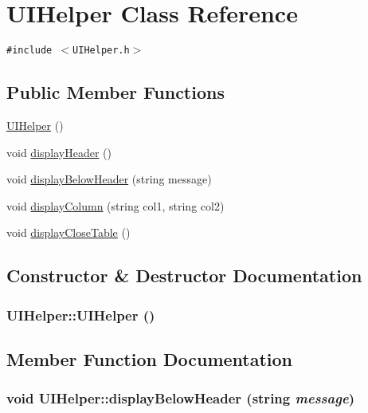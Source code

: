 \hypertarget{class_u_i_helper}{
\section{UIHelper Class Reference}
\label{class_u_i_helper}
}
{\tt \#include $<$UIHelper.h$>$}

\subsection*{Public Member Functions}
\begin{CompactItemize}
\item 
\hyperlink{class_u_i_helper_064f3bdbb8bc6545e365a04e701b2cb3}{UIHelper} ()
\item 
void \hyperlink{class_u_i_helper_626a53a3308909e66c67873826055ff9}{display\-Header} ()
\item 
void \hyperlink{class_u_i_helper_719a5786c348b5f4eff8811758726d1c}{display\-Below\-Header} (string message)
\item 
void \hyperlink{class_u_i_helper_4da5ae4ff9d2936bcb7463a79b4695be}{display\-Column} (string col1, string col2)
\item 
void \hyperlink{class_u_i_helper_dac3e7eda05dfd140c77278ab46fcd6d}{display\-Close\-Table} ()
\end{CompactItemize}


\subsection{Constructor \& Destructor Documentation}
\hypertarget{class_u_i_helper_064f3bdbb8bc6545e365a04e701b2cb3}{
\subsubsection[UIHelper]{\setlength{\rightskip}{0pt plus 5cm}UIHelper::UIHelper ()}}
\label{class_u_i_helper_064f3bdbb8bc6545e365a04e701b2cb3}




\subsection{Member Function Documentation}
\hypertarget{class_u_i_helper_719a5786c348b5f4eff8811758726d1c}{
\subsubsection[displayBelowHeader]{\setlength{\rightskip}{0pt plus 5cm}void UIHelper::display\-Below\-Header (string {\em message})}}
\label{class_u_i_helper_719a5786c348b5f4eff8811758726d1c}


